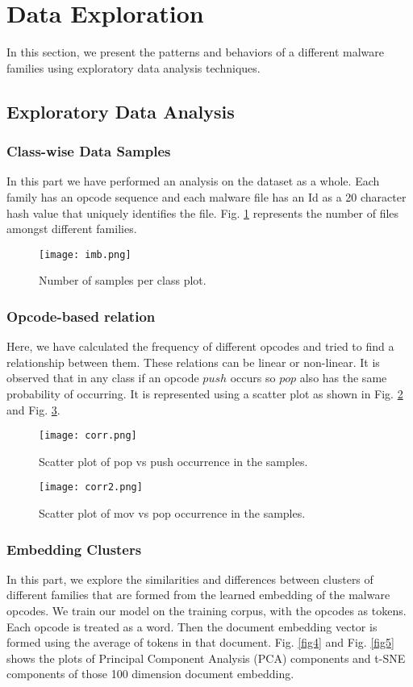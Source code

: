 \documentclass[conference]{IEEEtran}
\begin{document}
\section{Data Exploration}
In this section, we present the patterns and behaviors of a different malware families using exploratory data analysis techniques.
\subsection{Exploratory Data Analysis}
\subsubsection{Class-wise Data Samples}
In this part we have performed an analysis on the dataset as a whole. Each family has an opcode sequence and each malware file has an Id as a 20 character hash value that uniquely identifies the file.  Fig. \ref{fig1} represents the number of files amongst different families.

\begin{figure}[htbp]
\centerline{\texttt{[image: imb.png]}}
\caption{Number of samples per class plot.}
\label{fig1}
\end{figure}

\subsubsection{Opcode-based relation}
Here, we have calculated the frequency of different opcodes and tried to find a relationship between them. These relations can be linear or non-linear. It is observed that in any class if an opcode \(push\) occurs so \(pop\) also has the same probability of occurring. It is represented using a scatter plot as shown in Fig. \ref{fig2} and Fig. \ref{fig3}.
\begin{figure}[htbp]
\centerline{\texttt{[image: corr.png]}}
\caption{Scatter plot of pop vs push occurrence in the samples.}
\label{fig2}
\end{figure}

\begin{figure}[htbp]
\centerline{\texttt{[image: corr2.png]}}
\caption{Scatter plot of mov vs pop occurrence in the samples.}
\label{fig3}
\end{figure}

\subsubsection{Embedding Clusters}
In this part, we explore the similarities and differences between clusters of different families that are formed from the learned embedding of the malware opcodes. We train our model on the training corpus, with the opcodes as tokens. Each opcode is treated as a word. Then the document embedding vector is formed using the average of tokens in that document. Fig. \ref{fig4} and Fig. \ref{fig5} shows the plots of Principal Component Analysis (PCA) \cite{b9} components and t-SNE \cite{b8} components of those 100 dimension document embedding.
\end{document}
